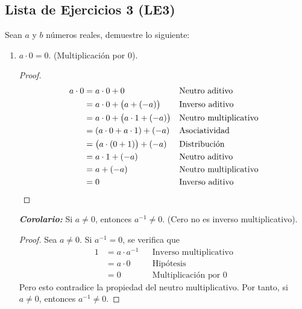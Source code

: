 \documentclass[11pt]{article}
\newcommand{\bfit}[1]{\textbf{\textit{#1}}}
\begin{document}
\pagebreak

\subsection*{Lista de Ejercicios 3 (LE3)}

Sean $a$ y $b$ números reales, demuestre lo siguiente:

\begin{enumerate}[label=\alph*)]

    \item $a \cdot 0 = 0$. (Multiplicación por $0$).
    \vspace{-1em}\begin{proof} 
        \begin{align*}
            a\cdot0&=a\cdot0+0 && \text{Neutro aditivo}\\
            &=a\cdot0+\bigl(a+\left(-a\right)\bigr) && \text{Inverso aditivo}\\
            &=a\cdot0+\bigl(a\cdot1+\left(-a\right)\bigr) && \text{Neutro multiplicativo}\\
            &=\left(a\cdot0+a\cdot1\right)+\left(-a\right) && \text{Asociatividad}\\
            &=\bigl(a\cdot\left(0+1\right)\bigr)+\left(-a\right) && \text{Distribución}\\
            &=a\cdot1+\left(-a\right) && \text{Neutro aditivo}\\
            &=a+\left(-a\right) && \text{Neutro multiplicativo}\\
            &=0 && \text{Inverso aditivo} \qedhere
        \end{align*}    
    \end{proof} \vspace{-1em}

    \bfit{Corolario:} Si $a\neq 0$, entonces $a^{-1}\neq 0$. (Cero no es inverso multiplicativo).
    \vspace{-1em}
    \begin{proof} 
        Sea $a\neq 0$. Si $a^{-1}=0$, se verifica que \begin{align*}
            1 &= a\cdot a^{-1} && \text{Inverso multiplicativo}\\
            &= a\cdot 0 && \text{Hipótesis}\\
            &= 0 && \text{Multiplicación por $0$}
        \end{align*} Pero esto contradice la propiedad del neutro multiplicativo. Por tanto, si $a\neq 0$, entonces $a^{-1}\neq 0$.
    \end{proof} \vspace{-1em}


\end{enumerate}
\end{document}
